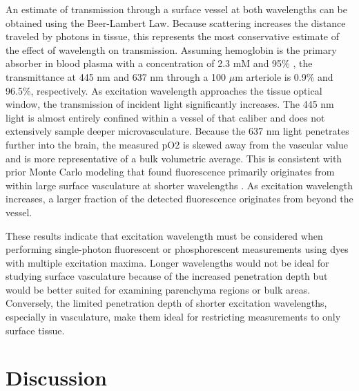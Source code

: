An estimate of transmission through a surface vessel at both wavelengths can be obtained using the Beer-Lambert Law. Because scattering increases the distance traveled by photons in tissue, this represents the most conservative estimate of the effect of wavelength on transmission. Assuming hemoglobin is the primary absorber in blood plasma with a concentration of 2.3 mM \cite{Robles:2010cw} and 95\% , the transmittance at 445 nm and 637 nm through a 100 $\mu$m arteriole is 0.9\% and 96.5\%, respectively. As excitation wavelength approaches the tissue optical window, the transmission of incident light significantly increases. The 445 nm light is almost entirely confined within a vessel of that caliber and does not extensively sample deeper microvasculature. Because the 637 nm light penetrates further into the brain, the measured pO2 is skewed away from the vascular value and is more representative of a bulk volumetric average. This is consistent with prior Monte Carlo modeling that found fluorescence primarily originates from within large surface vasculature at shorter wavelengths \cite{Davis:2011wj}. As excitation wavelength increases, a larger fraction of the detected fluorescence originates from beyond the vessel.

These results indicate that excitation wavelength must be considered when performing single-photon fluorescent or phosphorescent measurements using dyes with multiple excitation maxima. Longer wavelengths would not be ideal for studying surface vasculature because of the increased penetration depth but would be better suited for examining parenchyma regions or bulk areas. Conversely, the limited penetration depth of shorter excitation wavelengths, especially in vasculature, make them ideal for restricting measurements to only surface tissue.



\section{Discussion}

